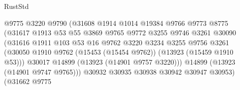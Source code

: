 \begin{lexlean}{RustStd}
\begin{coremodule}
                                        @9775
                                        @3220
                                        @9790
                                        (@31608
                                          @1914
                                          @1014
                                          @19384
                                          @9766
                                          @9773
                                          @8775
                                          (@31617
                                            @1913
                                            @53
                                            @55
                                            @3869
                                            @9765
                                            @9772
                                            @3255
                                            @9746
                                            @3261
                                            @30090
                                            (@31616
                                              @1911
                                              @103
                                              @53
                                              @16
                                              @9762
                                              @3220
                                              @3234
                                              @3255
                                              @9756
                                              @3261
                                              (@30050
                                                @1910
                                                @9762
                                                (@15453 (@15454 @9762))
                                                (@13923 (@15459 @1910 @53)))
                                              @30017
                                              @14899
                                              (@13923 (@14901 @9757 @3220)))
                                            @14899
                                            (@13923 (@14901 @9747 @9765)))
                                          @30932
                                          @30935
                                          @30938
                                          @30942
                                          @30947
                                          @30953)
                                        (@31662
                                          @9775

\end{coremodule}
\end{lexlean}
